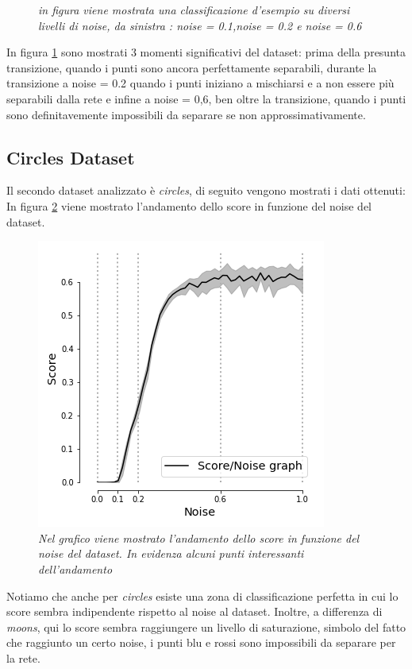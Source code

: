 \documentclass[12pt,a4paper]{report}
\begin{document}
\begin{figure}[H]
 \caption{\textit{in figura viene mostrata una classificazione d'esempio su diversi livelli di noise, da sinistra : noise = 0.1,noise = 0.2 e noise = 0.6}}
 \label{exnoisemoons}
\end{figure}

In figura \ref{exnoisemoons} sono mostrati 3 momenti significativi del dataset: prima della presunta transizione, quando i punti sono ancora perfettamente separabili, durante la transizione a noise = 0.2 quando i punti iniziano a mischiarsi e a  non essere più separabili dalla rete e infine a noise = 0,6, ben oltre la transizione, quando i punti sono definitavemente impossibili da separare se non approssimativamente.


\subsection{Circles Dataset}

Il secondo dataset analizzato è \textit{circles}, di seguito vengono mostrati i dati ottenuti:
In figura \ref{score_circles} viene mostrato l'andamento dello score in funzione del noise del dataset.

\begin{figure}[H]
 \centering
 \includegraphics[scale = 0.5]{images/score_noise_circles.png}
 \caption{\textit{Nel grafico viene mostrato l'andamento dello score in funzione del noise del dataset. In evidenza alcuni punti interessanti dell'andamento}}
 \label{score_circles}
\end{figure}

Notiamo che anche per \textit{circles} esiste una zona di classificazione perfetta in cui lo score sembra indipendente rispetto al noise al dataset.
Inoltre, a differenza di \textit{moons}, qui lo score sembra raggiungere un livello di saturazione, simbolo del fatto che raggiunto un certo noise, i punti blu e rossi sono impossibili da separare per la rete. 
\end{document}
